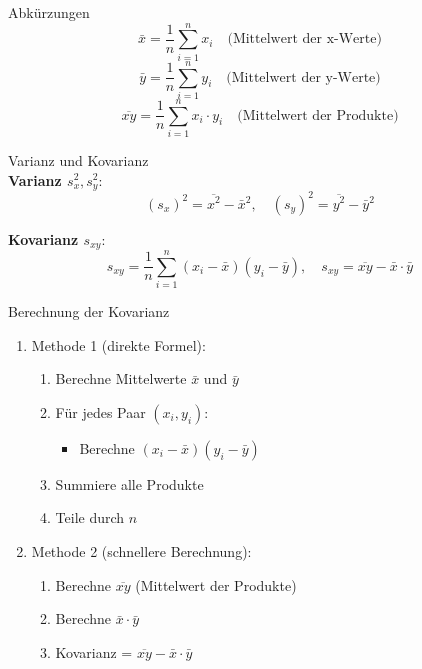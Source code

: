 \begin{concept}{Abkürzungen}\\
$$\bar{x} = \frac{1}{n}\sum_{i=1}^{n} x_i \quad \text{(Mittelwert der x-Werte)}$$
$$\bar{y} = \frac{1}{n}\sum_{i=1}^{n} y_i \quad \text{(Mittelwert der y-Werte)}$$
$$\overline{xy} = \frac{1}{n}\sum_{i=1}^{n} x_i \cdot y_i \quad \text{(Mittelwert der Produkte)}$$
\end{concept}

\begin{definition}{Varianz und Kovarianz}\\
\textbf{Varianz $s_x^2, s_y^2$}:
$$(s_x)^2 = \overline{x^2} - \bar{x}^2, \quad (s_y)^2 = \overline{y^2} - \bar{y}^2$$

\textbf{Kovarianz $s_{xy}$}:
$$s_{xy} = \frac{1}{n}\sum_{i=1}^{n}(x_i - \bar{x})(y_i - \bar{y}), \quad s_{xy} = \overline{xy} - \bar{x} \cdot \bar{y}$$
\end{definition}

\begin{KR}{Berechnung der Kovarianz}
\begin{enumerate}
    \item Methode 1 (direkte Formel):
        \begin{enumerate}
            \item Berechne Mittelwerte $\bar{x}$ und $\bar{y}$
            \item Für jedes Paar $(x_i,y_i)$:
                \begin{itemize}
                    \item Berechne $(x_i - \bar{x})(y_i - \bar{y})$
                \end{itemize}
            \item Summiere alle Produkte
            \item Teile durch $n$
        \end{enumerate}
    \item Methode 2 (schnellere Berechnung):
        \begin{enumerate}
            \item Berechne $\overline{xy}$ (Mittelwert der Produkte)
            \item Berechne $\bar{x} \cdot \bar{y}$
            \item Kovarianz = $\overline{xy} - \bar{x} \cdot \bar{y}$
        \end{enumerate}
\end{enumerate}
\end{KR}

